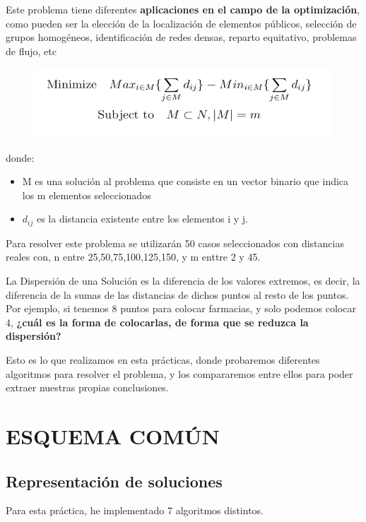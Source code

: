 \documentclass{article}
\begin{document}
Este problema tiene diferentes \textbf{aplicaciones en el campo de la optimización},
como pueden ser la elección de la localización de elementos públicos, selección
de grupos homogéneos, identificación de redes densas, reparto equitativo, problemas
de flujo, etc

\begin{figure}[h]
    \centering
    \includegraphics[scale=0.5]{FormulaMinimizacion.png}
\end{figure}

donde:
\begin{itemize}
\item M es una solución al problema que consiste en un vector binario que indica los m
elementos seleccionados
\item$d_{ij}$ es la distancia existente entre los elementos i y j.
\end{itemize}

Para resolver este problema se utilizarán 50 casos seleccionados con distancias reales
con, n entre {25,50,75,100,125,150}, y m enttre 2 y 45.

\vspace{5mm} 

La Dispersión de una Solución es la diferencia de los valores extremos, es decir,
la diferencia de la sumas de las distancias de dichos puntos al resto de los puntos.
Por ejemplo, si tenemos 8 puntos para colocar farmacias, y solo podemos colocar 4,
\textbf{¿cuál es la forma de colocarlas, de forma que se reduzca la dispersión?}

\vspace{5mm}

Esto es lo que realizamos en esta prácticas, donde probaremos diferentes algoritmos
para resolver el problema, y los compararemos entre ellos para poder extraer nuestras
propias conclusiones.

\newpage

\section{\large ESQUEMA COMÚN}

\subsection{\large Representación de soluciones}
Para esta práctica, he implementado 7 algoritmos distintos.
\end{document}
